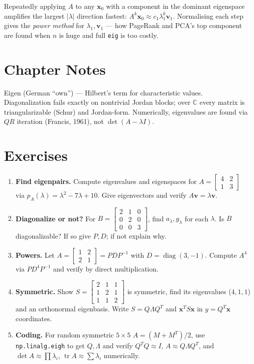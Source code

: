 \begin{example}
Repeatedly applying $A$ to any $\mathbf{x}_0$ with a component in the dominant eigenspace amplifies the largest $|\lambda|$ direction fastest: $A^k\mathbf{x}_0\approx c_1\lambda_1^k\mathbf{v}_1$. Normalising each step gives the \emph{power method} for $\lambda_1,\mathbf{v}_1$ --- how PageRank and PCA's top component are found when $n$ is huge and full \texttt{eig} is too costly.
\end{example}


\section{Chapter Notes}
Eigen (German ``own'') --- Hilbert's term for characteristic values. Diagonalization fails exactly on nontrivial Jordan blocks; over $\mathbb{C}$ every matrix is triangularizable (Schur) and Jordan-form. Numerically, eigenvalues are found via $QR$ iteration (Francis, 1961), not $\det(A-\lambda I)$.

\section{Exercises}
\label{sec:ch08-exercises}
\begin{enumerate}[label=E8.\arabic*, leftmargin=*, itemsep=0.8em]
\item \textbf{Find eigenpairs.} Compute eigenvalues and eigenspaces for $A=\begin{bmatrix}4&2\\1&3\end{bmatrix}$ via $p_A(\lambda)=\lambda^2-7\lambda+10$. Give eigenvectors and verify $A\mathbf{v}=\lambda\mathbf{v}$.
\item \textbf{Diagonalize or not?} For $B=\begin{bmatrix}2&1&0\\0&2&0\\0&0&3\end{bmatrix}$, find $a_\lambda,g_\lambda$ for each $\lambda$. Is $B$ diagonalizable? If so give $P,D$; if not explain why.
\item \textbf{Powers.} Let $A=\begin{bmatrix}1&2\\2&1\end{bmatrix}=PDP^{-1}$ with $D=\operatorname{diag}(3,-1)$. Compute $A^4$ via $PD^4P^{-1}$ and verify by direct multiplication.
\item \textbf{Symmetric.} Show $S=\begin{bmatrix}2&1&1\\1&2&1\\1&1&2\end{bmatrix}$ is symmetric, find its eigenvalues ($4,1,1$) and an orthonormal eigenbasis. Write $S=Q\Lambda Q^T$ and $\mathbf{x}^TS\mathbf{x}$ in $y=Q^T\mathbf{x}$ coordinates.
\item \textbf{Coding.} For random symmetric $5\times5$ $A=(M+M^T)/2$, use \texttt{np.linalg.eigh} to get $Q,\Lambda$ and verify $Q^TQ\approx I$, $A\approx Q\Lambda Q^T$, and $\det A\approx\prod\lambda_i$, $\operatorname{tr}A\approx\sum\lambda_i$ numerically.
\end{enumerate}
